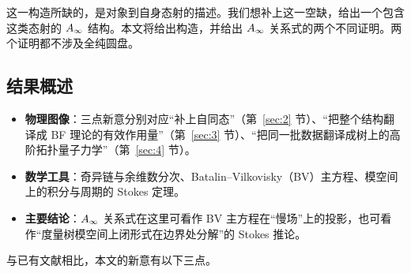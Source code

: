 
这一构造所缺的，是对象到自身态射的描述。我们想补上这一空缺，给出一个包含这类态射的 $A_\infty$ 结构。本文将给出构造，并给出 $A_\infty$ 关系式的两个不同证明。两个证明都不涉及全纯圆盘。


\subsection{结果概述}\label{sec:1.1}

\begin{takeaway}
\begin{itemize}
  \item \textbf{物理图像}：三点新意分别对应“补上自同态”（第~\ref{sec:2} 节）、“把整个结构翻译成 BF 理论的有效作用量”（第~\ref{sec:3} 节）、“把同一批数据翻译成树上的高阶拓扑量子力学”（第~\ref{sec:4} 节）。
  \item \textbf{数学工具}：奇异链与余维数分次、Batalin--Vilkovisky（BV）主方程、模空间上的积分与周期的 Stokes 定理。
  \item \textbf{主要结论}：$A_\infty$ 关系式在这里可看作 BV 主方程在“慢场”上的投影，也可看作“度量树模空间上闭形式在边界处分解”的 Stokes 推论。
\end{itemize}
\end{takeaway}

与已有文献相比，本文的新意有以下三点。


